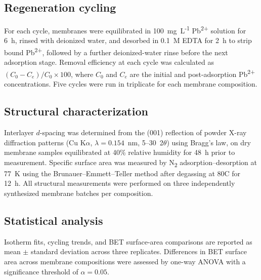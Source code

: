 \subsection{Regeneration cycling}

For each cycle, membranes were equilibrated in 100~mg~L\textsuperscript{-1} Pb\textsuperscript{2+} solution for 6~h, rinsed with deionized water, and desorbed in 0.1~M EDTA for 2~h to strip bound Pb\textsuperscript{2+}, followed by a further deionized-water rinse before the next adsorption stage. Removal efficiency at each cycle was calculated as $(C_0 - C_e)/C_0 \times 100$, where $C_0$ and $C_e$ are the initial and post-adsorption Pb\textsuperscript{2+} concentrations. Five cycles were run in triplicate for each membrane composition.

\subsection{Structural characterization}

Interlayer $d$-spacing was determined from the (001) reflection of powder X-ray diffraction patterns (Cu K$\alpha$, $\lambda = 0.154$~nm, 5--30\textdegree\ 2$\theta$) using Bragg's law, on dry membrane samples equilibrated at 40\% relative humidity for 48~h prior to measurement. Specific surface area was measured by N\textsubscript{2} adsorption--desorption at 77~K using the Brunauer--Emmett--Teller method after degassing at 80\textdegree C for 12~h. All structural measurements were performed on three independently synthesized membrane batches per composition.

\subsection{Statistical analysis}

Isotherm fits, cycling trends, and BET surface-area comparisons are reported as mean $\pm$ standard deviation across three replicates. Differences in BET surface area across membrane compositions were assessed by one-way ANOVA with a significance threshold of $\alpha = 0.05$.
